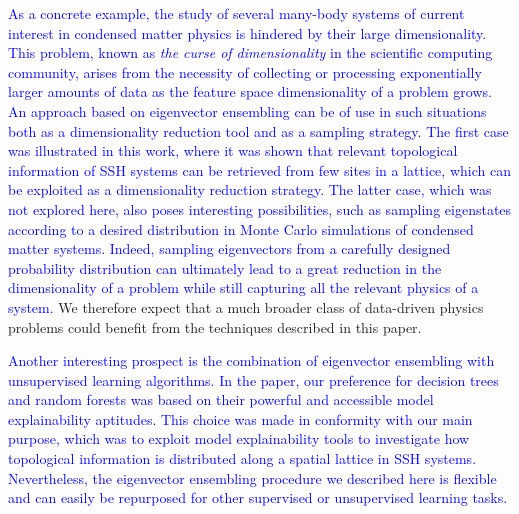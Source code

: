 \documentclass[10pt]{revtex4-1}
\begin{document}
\textcolor{blue}{As a concrete example, the study of several many-body systems of current interest in condensed matter physics is hindered by their large dimensionality. This problem, known as \emph{the curse of dimensionality} in the scientific computing community, arises from the necessity of collecting or processing exponentially larger amounts of data as the feature space dimensionality of a problem grows. An approach based on eigenvector ensembling can be of use in such situations both as a dimensionality reduction tool and as a sampling strategy. The first case was illustrated in this work, where it was shown that relevant topological information of SSH systems can be retrieved from few sites in a lattice, which can be exploited as a dimensionality reduction strategy. The latter case, which was not explored here, also poses interesting possibilities, such as sampling eigenstates according to a desired distribution in Monte Carlo simulations of condensed matter systems. Indeed, sampling eigenvectors from a carefully designed probability distribution can ultimately lead to a great reduction in the dimensionality of a problem while still capturing all the relevant physics of a system.} We therefore expect that a much broader class of data-driven physics problems could benefit from the techniques described in this paper.

\textcolor{blue}{Another interesting prospect is the combination of eigenvector ensembling with unsupervised learning algorithms. In the paper, our preference for decision trees and random forests was based on their powerful and accessible model explainability aptitudes. This choice was made in conformity with our main purpose, which was to exploit model explainability tools to investigate how topological information is distributed along a spatial lattice in SSH systems. Nevertheless, the eigenvector ensembling procedure we described here is flexible and can easily be repurposed for other supervised or unsupervised learning tasks.}
\end{document}

